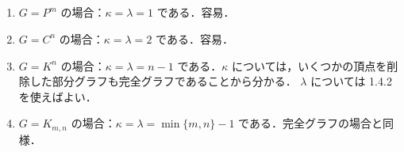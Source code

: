 \subsection{}
\begin{enumerate}
 \item $G = P^m$ の場合：$\kappa = \lambda = 1$ である．容易．
 \item $G = C^n$ の場合：$\kappa = \lambda = 2$ である．容易．
 \item $G = K^n$ の場合：$\kappa = \lambda = n-1$ である．$\kappa$ については，いくつかの頂点を削除した部分グラフも完全グラフであることから分かる．
 $\lambda$ については 1.4.2 を使えばよい．
 \item $G = K_{m,n}$ の場合：$\kappa = \lambda = \min\{m,n\}-1$ である．完全グラフの場合と同様．
\end{enumerate}